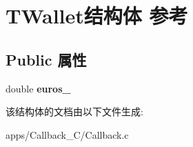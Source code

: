 \hypertarget{struct_t_wallet}{\section{T\+Wallet结构体 参考}
\label{struct_t_wallet}
}
\subsection*{Public 属性}
\begin{DoxyCompactItemize}
\item 
\hypertarget{struct_t_wallet_a5753a25efbe5f6f79bca68344523ba0c}{double {\bfseries euros\+\_\+}}\label{struct_t_wallet_a5753a25efbe5f6f79bca68344523ba0c}

\end{DoxyCompactItemize}


该结构体的文档由以下文件生成\+:\begin{DoxyCompactItemize}
\item 
apps/\+Callback\+\_\+\+C/Callback.\+c\end{DoxyCompactItemize}
